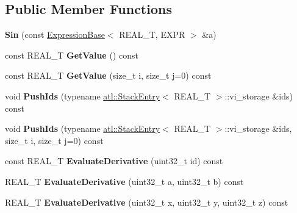 \subsection*{Public Member Functions}
\begin{DoxyCompactItemize}
\item 
\hypertarget{structatl_1_1_sin_a3df17d8ff481eb5f7f28124f4679f57a}{{\bfseries Sin} (const \hyperlink{structatl_1_1_expression_base}{Expression\+Base}$<$ R\+E\+A\+L\+\_\+\+T, E\+X\+P\+R $>$ \&a)}\label{structatl_1_1_sin_a3df17d8ff481eb5f7f28124f4679f57a}

\item 
\hypertarget{structatl_1_1_sin_a33dcd22967cf5fcbfc6b4ee03ba577da}{const R\+E\+A\+L\+\_\+\+T {\bfseries Get\+Value} () const }\label{structatl_1_1_sin_a33dcd22967cf5fcbfc6b4ee03ba577da}

\item 
\hypertarget{structatl_1_1_sin_aaed0fa6931d8bbdcf99a9fd90ad39762}{const R\+E\+A\+L\+\_\+\+T {\bfseries Get\+Value} (size\+\_\+t i, size\+\_\+t j=0) const }\label{structatl_1_1_sin_aaed0fa6931d8bbdcf99a9fd90ad39762}

\item 
\hypertarget{structatl_1_1_sin_aa56f96071ecd7ca0deb76bfec206121a}{void {\bfseries Push\+Ids} (typename \hyperlink{structatl_1_1_stack_entry}{atl\+::\+Stack\+Entry}$<$ R\+E\+A\+L\+\_\+\+T $>$\+::vi\+\_\+storage \&ids) const }\label{structatl_1_1_sin_aa56f96071ecd7ca0deb76bfec206121a}

\item 
\hypertarget{structatl_1_1_sin_ae8a1e5a0999a8482c13e94aada70ffa8}{void {\bfseries Push\+Ids} (typename \hyperlink{structatl_1_1_stack_entry}{atl\+::\+Stack\+Entry}$<$ R\+E\+A\+L\+\_\+\+T $>$\+::vi\+\_\+storage \&ids, size\+\_\+t i, size\+\_\+t j=0) const }\label{structatl_1_1_sin_ae8a1e5a0999a8482c13e94aada70ffa8}

\item 
\hypertarget{structatl_1_1_sin_acd21686f4f342cb039451d2b2cb679c7}{const R\+E\+A\+L\+\_\+\+T {\bfseries Evaluate\+Derivative} (uint32\+\_\+t id) const }\label{structatl_1_1_sin_acd21686f4f342cb039451d2b2cb679c7}

\item 
\hypertarget{structatl_1_1_sin_aa04776c66ce58b543fcdc2ce0c2e5d00}{R\+E\+A\+L\+\_\+\+T {\bfseries Evaluate\+Derivative} (uint32\+\_\+t a, uint32\+\_\+t b) const }\label{structatl_1_1_sin_aa04776c66ce58b543fcdc2ce0c2e5d00}

\item 
\hypertarget{structatl_1_1_sin_ac050a241fa8fab93a53c51c036472554}{R\+E\+A\+L\+\_\+\+T {\bfseries Evaluate\+Derivative} (uint32\+\_\+t x, uint32\+\_\+t y, uint32\+\_\+t z) const }\label{structatl_1_1_sin_ac050a241fa8fab93a53c51c036472554}


\end{DoxyCompactItemize}
